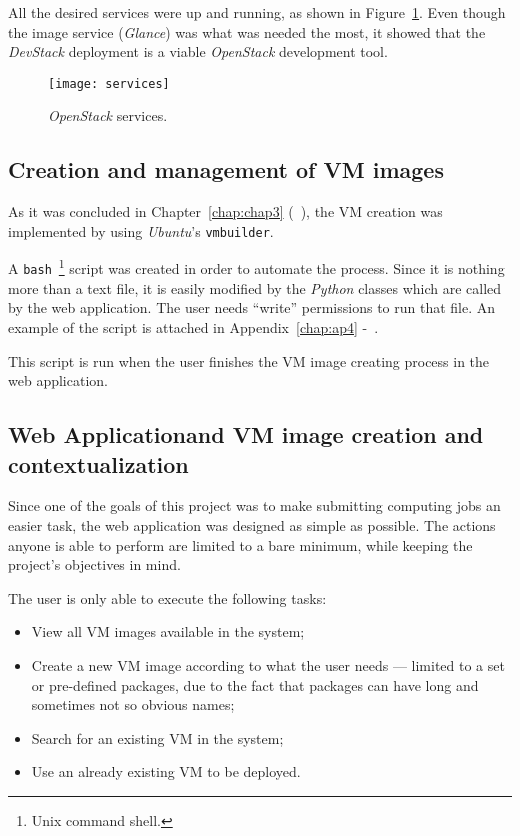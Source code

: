 All the desired services were up and running, as shown in Figure~\ref{fig:services}. Even though the image service (\textit{Glance}) was what was needed the most, it showed that the \textit{DevStack} deployment is a viable \textit{OpenStack} development tool.

\begin{figure}[h]
  \begin{center}
    \leavevmode
    \texttt{[image: services]}
    \caption{\textit{OpenStack} services.}
    \label{fig:services}
  \end{center}
\end{figure}

\subsection{Creation and management of VM images}\label{subsec:vm-create-manage}

As it was concluded in Chapter~\ref{chap:chap3} (~), the VM creation was implemented by using \textit{Ubuntu}'s \texttt{vmbuilder}. 

A \texttt{bash}~\footnote{Unix command shell.} script was created in order to automate the process. Since it is nothing more than a text file, it is easily modified by the \textit{Python} classes which are called by the web application. The user needs ``write'' permissions to run that file. An example of the script is attached in Appendix~\ref{chap:ap4} -~.

This script is run when the user finishes the VM image creating process in the web application.

\subsection{Web Applicationand VM image creation and contextualization}\label{subsec:webapp}

Since one of the goals of this project was to make submitting computing jobs an easier task, the web application was designed as simple as possible. The actions anyone is able to perform are limited to a bare minimum, while keeping the project's objectives in mind.

The user is only able to execute the following tasks:

\begin{itemize}
\item View all VM images available in the system;
\item Create a new VM image according to what the user needs --- limited to a set or pre-defined packages, due to the fact that packages can have long and sometimes not so obvious names;
\item Search for an existing VM in the system;
\item Use an already existing VM to be deployed.
\end{itemize}

